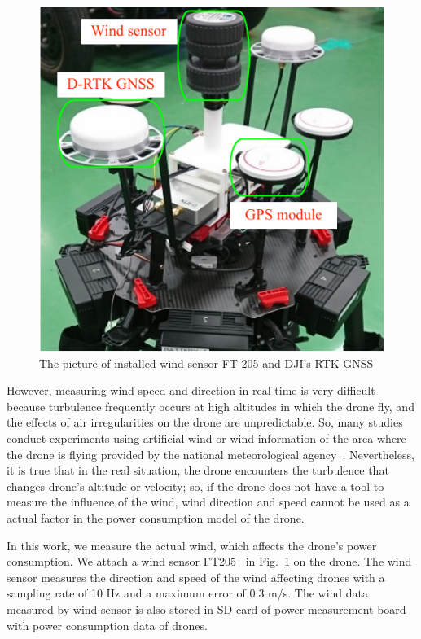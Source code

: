 \documentclass[journal]{./template/IEEEtran}
\begin{document}
\begin{figure}[ht]
\centering\includegraphics[scale=0.75]{fig5/wind_sensor.pdf}
\caption{The picture of installed wind sensor FT-205 and DJI's RTK GNSS}
\label{fig:wind_sensor}
\end{figure}

However, measuring wind speed and direction in real-time is very difficult because turbulence frequently occurs at high altitudes in which the drone fly, and the effects of air irregularities on the drone are unpredictable.
So, many studies conduct experiments using artificial wind or wind information of the area where the drone is flying provided by the national meteorological agency~\cite{ref_5,ref_9}. 
Nevertheless, it is true that in the real situation, the drone encounters the turbulence that changes drone's altitude or velocity; so, if the drone does not have a tool to measure the influence of the wind, wind direction and speed cannot be used as a actual factor in the power consumption model of the drone. 

In this work, we measure the actual wind, which affects the drone's power consumption. We attach a wind sensor FT205~\cite{ref_15} in Fig.~\ref{fig:wind_sensor} on the drone. 
The wind sensor measures the direction and speed of the wind affecting drones with a sampling rate of 10 Hz and a maximum error of 0.3 m/s.
The wind data measured by wind sensor is also stored in SD card of power measurement board with power consumption data of drones.
\end{document}

